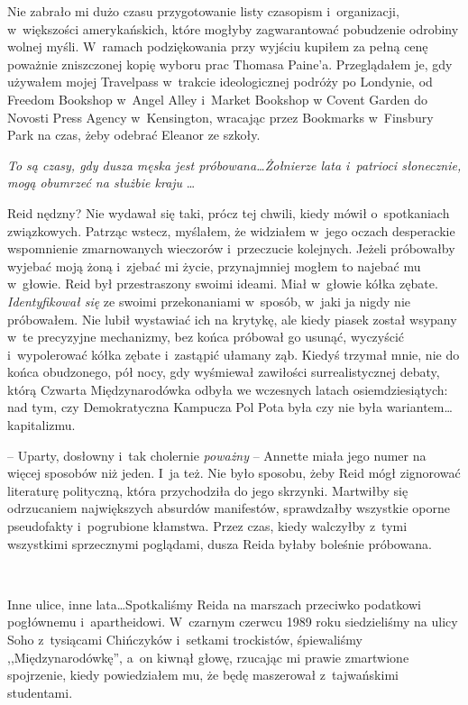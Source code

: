 \documentclass[oneside,polish,11pt,sfheadings]{mwbk}
\let\footnote=\endnote
\begin{document}
Nie zabrało mi dużo czasu przygotowanie listy czasopism i~organizacji, w~większości amerykańskich, które mogłyby zagwarantować pobudzenie
odrobiny wolnej myśli. W~ramach podziękowania przy wyjściu kupiłem za
pełną cenę poważnie zniszczonej kopię wyboru prac Thomasa Paine'a.
Przeglądałem je, gdy używałem mojej Travelpass w~trakcie ideologicznej
podróży po Londynie, od Freedom Bookshop w~Angel Alley i~Market Bookshop
w Covent Garden do Novosti Press Agency w~Kensington, wracając przez
Bookmarks w~Finsbury Park na czas, żeby odebrać Eleanor ze szkoły.

\emph{To są czasy, gdy dusza męska jest próbowana\ldots Żołnierze lata i~patrioci słonecznie, mogą obumrzeć na służbie kraju\footnote{cytaty z~,,American Crisis'' Thomasa Paine -- przyp.tłum.}} \ldots 

Reid nędzny? Nie wydawał się taki, prócz tej chwili, kiedy mówił o~spotkaniach związkowych. Patrząc wstecz, myślałem, że widziałem w~jego
oczach desperackie wspomnienie zmarnowanych wieczorów i~przeczucie
kolejnych. Jeżeli próbowałby wyjebać moją żoną i~zjebać mi życie,
przynajmniej mogłem to najebać mu w~głowie. Reid był przestraszony
swoimi ideami. Miał w~głowie kółka zębate. \emph{Identyfikował się} ze
swoimi przekonaniami w~sposób, w~jaki ja nigdy nie próbowałem. Nie lubił
wystawiać ich na krytykę, ale kiedy piasek został wsypany w~te
precyzyjne mechanizmy, bez końca próbował go usunąć, wyczyścić i~wypolerować kółka zębate i~zastąpić ułamany ząb. Kiedyś trzymał mnie,
nie do końca obudzonego, pół nocy, gdy wyśmiewał zawiłości
surrealistycznej debaty, którą Czwarta Międzynarodówka odbyła we
wczesnych latach osiemdziesiątych: nad tym, czy Demokratyczna Kampucza
Pol Pota była czy nie była wariantem\ldots kapitalizmu.

-- Uparty, dosłowny i~tak cholernie \emph{poważny} -- Annette miała jego
numer na więcej sposobów niż jeden. I~ja też. Nie było sposobu, żeby
Reid mógł zignorować literaturę polityczną, która przychodziła do jego
skrzynki. Martwiłby się odrzucaniem największych absurdów manifestów,
sprawdzałby wszystkie oporne pseudofakty i~pogrubione kłamstwa. Przez
czas, kiedy walczyłby z~tymi wszystkimi sprzecznymi poglądami, dusza
Reida byłaby boleśnie próbowana.

~

Inne ulice, inne lata\ldots Spotkaliśmy Reida na marszach przeciwko
podatkowi pogłównemu i~apartheidowi. W~czarnym czerwcu 1989 roku
siedzieliśmy na ulicy Soho z~tysiącami Chińczyków i~setkami trockistów,
śpiewaliśmy ,,Międzynarodówkę'', a~on kiwnął głowę, rzucając mi prawie
zmartwione spojrzenie, kiedy powiedziałem mu, że będę maszerował z~tajwańskimi studentami.
\end{document}
